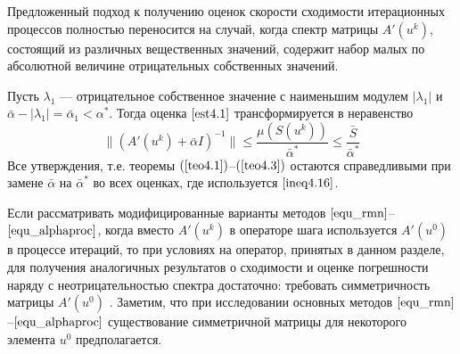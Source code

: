 {\remark Предложенный подход к получению оценок скорости сходимости итерационных процессов полностью переносится на случай, когда спектр матрицы $A'(u^k)$, состоящий из различных вещественных значений, содержит набор малых по абсолютной величине отрицательных собственных значений.} 

Пусть $\lambda _1$ --- отрицательное собственное значение с наименьшим модулем $|\lambda_1|$ и $\bar\alpha -|\lambda _1|=\bar\alpha _1<\alpha^*$. Тогда оценка $\eqref{est4.1}$ трансформируется в неравенство
\begin{equation}\label{ineq4.16}
\|(A'(u^k)+\bar\alpha I)^{-1}\|\le\frac{\mu(S(u^k))}{\bar\alpha^*}\le\frac{\bar S}{\bar\alpha^*}
\end{equation}
Все утверждения, т.е. теоремы $(\ref{teo4.1})$--$(\ref{teo4.3})$ остаются справедливыми при замене $\bar\alpha$ на $\bar\alpha^*$ во всех оценках, где используется $\eqref{ineq4.16}$.

{\remark Если рассматривать модифицированные варианты методов $\eqref{equ_rmn}$--$\eqref{equ_alphaproc}$, когда вместо $A'(u^k)$ в операторе шага используется $A'(u^0)$ в процессе итераций, то при условиях на оператор, принятых в данном разделе, для получения аналогичных результатов о сходимости и оценке погрешности наряду с неотрицательностью спектра достаточно: требовать симметричность матрицы $A'(u^0)$ \cite{VasAkiMin2013, Vasin2014, Vasin2016}. Заметим, что при исследовании основных методов $\eqref{equ_rmn}$--$\eqref{equ_alphaproc}$ существование симметричной матрицы для некоторого элемента $u^0$ предполагается.}

\newpage
